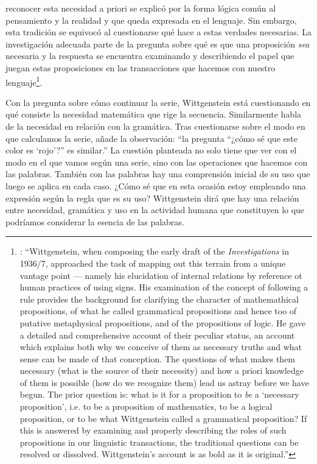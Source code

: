 reconocer esta necesidad a priori se explicó por la forma lógica común al pensamiento y la realidad y que queda expresada en el lenguaje. Sin embargo, esta tradición se equivocó al cuestionarse qué hace a estas verdades necesarias. La investigación adecuada parte de la pregunta sobre qué es que una proposición \emph{sea} necesaria y la respuesta se encuentra examinando y describiendo el papel que juegan estas proposiciones en las transacciones que hacemos con nuestro lenguaje\footnote{\cite[Cf.~][242--243]{bakerhacker2014rules}: \enquote{Wittgenstein, when composing the early draft of the \emph{Investigations} in 1936/7, approached the task of mapping out this terrain from a unique vantage point --- namely his elucidation of internal relations by reference ot human practices of using signs. His examination of the concept of following a rule provides the background for clarifying the character of mathemathical propositions, of what he called grammatical propositions and hence too of putative metaphysical propositions, and of the propositions of logic. He gave a detailed and comprehensive account of their peculiar status, an account which explains both why we conceive of them as necessary truths and what sense can be made of that conception. The questions of what makes them necessary (what is the source of their necessity) and how a priori knowledge of them is possible (how do we recognize them) lead us astray before we have begun. The prior question is: what is it for a proposition to \emph{be} a `necessary proposition', i.e. to be a proposition of mathematics, to be a logical proposition, or to be what Wittgenstein called a grammatical proposition? If this is answered by examining and properly describing the roles of such propositions in our linguistic transactions, the traditional questions can be resolved or dissolved. Wittgenstein's account is as bold as it is original.}}.

Con la pregunta sobre cómo continuar la serie, Wittgenstein está cuestionando en qué consiste la necesidad matemática que rige la secuencia. Similarmente habla de la necesidad en relación con la gramática. Tras cuestionarse sobre el modo en que calculamos la serie, añade la observación: \enquote{la pregunta ``¿cómo sé que este color es `rojo'?'' es similar.} La cuestión planteada no solo tiene que ver con el modo en el que vamos según una serie, sino con las operaciones que hacemos con las palabras. También con las palabras hay una comprensión inicial de su uso que luego se aplica en cada caso. ¿Cómo sé que en esta ocasión estoy empleando una expresión según la regla que es su uso? Wittgenstein dirá que hay una relación entre necesidad, gramática y uso en la actividad humana que constituyen lo que podríamos considerar la esencia de las palabras.

